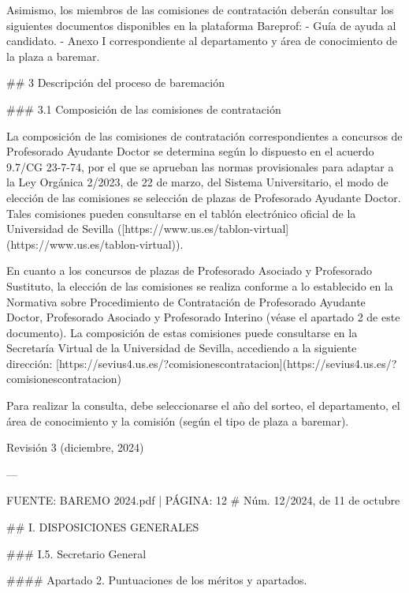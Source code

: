 \documentclass{article}
\begin{document}
\begin{itemize}
\begin{itemize}
\begin{scriptsize}
                  Asimismo, los miembros de las comisiones de contratación deberán consultar los siguientes documentos disponibles en la plataforma Bareprof:
                  - Guía de ayuda al candidato.
                  - Anexo I correspondiente al departamento y área de conocimiento de la plaza a baremar.

                  \#\# 3 Descripción del proceso de baremación

                  \#\#\# 3.1 Composición de las comisiones de contratación

                  La composición de las comisiones de contratación correspondientes a concursos de Profesorado Ayudante Doctor se determina según lo dispuesto en el acuerdo 9.7/CG 23-7-74, por el que se aprueban las normas provisionales para adaptar a la Ley Orgánica 2/2023, de 22 de marzo, del Sistema Universitario, el modo de elección de las comisiones se selección de plazas de Profesorado Ayudante Doctor. Tales comisiones pueden consultarse en el tablón electrónico oficial de la Universidad de Sevilla ([https://www.us.es/tablon-virtual](https://www.us.es/tablon-virtual)).

                  En cuanto a los concursos de plazas de Profesorado Asociado y Profesorado Sustituto, la elección de las comisiones se realiza conforme a lo establecido en la Normativa sobre Procedimiento de Contratación de Profesorado Ayudante Doctor, Profesorado Asociado y Profesorado Interino (véase el apartado 2 de este documento). La composición de estas comisiones puede consultarse en la Secretaría Virtual de la Universidad de Sevilla, accediendo a la siguiente dirección:
                  [https://sevius4.us.es/?comisionescontratacion](https://sevius4.us.es/?comisionescontratacion)

                  Para realizar la consulta, debe seleccionarse el año del sorteo, el departamento, el área de conocimiento y la comisión (según el tipo de plaza a baremar).

                  Revisión 3 (diciembre, 2024)

                  ---

                  FUENTE: BAREMO 2024.pdf | PÁGINA: 12
                  \# Núm. 12/2024, de 11 de octubre

                  \#\# I. DISPOSICIONES GENERALES

                  \#\#\# I.5. Secretario General

                  \#\#\#\# Apartado 2. Puntuaciones de los méritos y apartados.


\end{scriptsize}
\end{itemize}
\end{itemize}
\end{document}
